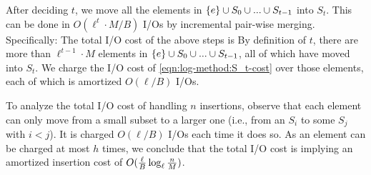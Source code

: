 \vgap

After deciding $t$, we move all the elements in $\{e\} \cup S_0 \cup ... \cup S_{t-1}$ into $S_t$. This can be done in $O(\ell^t \cdot M / B)$ I/Os by incremental pair-wise merging. Specifically:
The total I/O cost of the above steps is
By definition of $t$, there are more than $\ell^{t-1} \cdot M$ elements in $\{e\} \cup S_0 \cup ... \cup S_{t-1}$, all of which have moved into $S_t$. We charge the I/O cost of \eqref{eqn:log-method:S_t-cost} over those elements, each of which is amortized $O(\ell / B)$ I/Os.

\vgap

To analyze the total I/O cost of handling $n$ insertions, observe that each element can only move from a small subset to a larger one (i.e., from an $S_i$ to some $S_j$ with $i < j$). It is charged $O(\ell/B)$ I/Os each time it does so. As an element can be charged at most $h$ times, we conclude that the total I/O cost is
implying an amortized insertion cost of $O(\frac{\ell}{B} \log_\ell \frac{n}{M})$.







